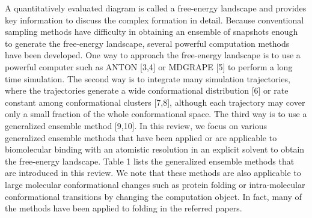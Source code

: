 A quantitatively evaluated diagram is called a free-energy landscape and provides key information to discuss the complex formation in detail. Because conventional sampling methods have difficulty in obtaining an ensemble of snapshots enough to generate the free-energy landscape, several powerful computation methods have been developed. One way to approach the free-energy landscape is to use a powerful computer such as ANTON [3,4] or MDGRAPE [5] to perform a long time simulation. The second way is to integrate many simulation trajectories, where the trajectories generate a wide conformational distribution [6] or rate constant among conformational clusters [7,8], although each trajectory may cover only a small fraction of the whole conformational space. The third way is to use a generalized ensemble method [9,10]. In this review, we focus on various generalized ensemble methods that have been applied or are applicable to biomolecular binding with an atomistic resolution in an explicit solvent to obtain the free-energy landscape. Table 1 lists the generalized ensemble methods that are introduced in this review. We note that these methods are also applicable to large molecular conformational changes such as protein folding or intra-molecular conformational transitions by changing the computation object. In fact, many of the methods have been applied to folding in the referred papers.

